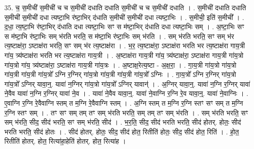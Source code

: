 \documentclass[17pt]{extarticle}
\begin{document}
35. च॒ स॒मीची॑ स॒मीची॑ च च स॒मीची॑ दधाति दधाति स॒मीची॑ च च स॒मीची॑ दधाति । . स॒मीची॑ दधाति दधाति स॒मीची॑ स॒मीची॑ दधा त्यष्टा॒भि र॑ष्टा॒भिर् द॑धाति स॒मीची॑ स॒मीची॑ दधा त्यष्टा॒भिः । . स॒मीची॒ इति॑ स॒मीची᳚ । . द॒धा॒ त्य॒ष्टा॒भि र॑ष्टा॒भिर् द॑धाति दधा त्यष्टा॒भिः सꣳ स म॑ष्टा॒भिर् द॑धाति दधा त्यष्टा॒भिः सम् । . अ॒ष्टा॒भिः सꣳ स म॑ष्टा॒भि र॑ष्टा॒भिः सम् भ॑रति भरति॒ स म॑ष्टा॒भि र॑ष्टा॒भिः सम् भ॑रति । . सम् भ॑रति भरति॒ सꣳ सम् भ॑र त्य॒ष्टाक्ष॑रा॒ ऽष्टाक्ष॑रा भरति॒ सꣳ सम् भ॑र त्य॒ष्टाक्ष॑रा । . भ॒र॒ त्य॒ष्टाक्ष॑रा॒ ऽष्टाक्ष॑रा भरति भर त्य॒ष्टाक्ष॑रा गाय॒त्री गा॑य॒ त्र्य॑ष्टाक्ष॑रा भरति भर त्य॒ष्टाक्ष॑रा गाय॒त्री । . अ॒ष्टाक्ष॑रा गाय॒त्री गा॑य॒ त्र्य॑ष्टाक्ष॑रा॒ ऽष्टाक्ष॑रा गाय॒त्री गा॑य॒त्रो गा॑य॒त्रो गा॑य॒ त्र्य॑ष्टाक्ष॑रा॒ ऽष्टाक्ष॑रा गाय॒त्री गा॑य॒त्रः । . अ॒ष्टाक्ष॒रेत्य॒ष्टा - अ॒क्ष॒रा॒ । . गा॒य॒त्री गा॑य॒त्रो गा॑य॒त्रो गा॑य॒त्री गा॑य॒त्री गा॑य॒त्रो᳚ ऽग्नि र॒ग्निर् गा॑य॒त्रो गा॑य॒त्री गा॑य॒त्री गा॑य॒त्रो᳚ ऽग्निः । . गा॒य॒त्रो᳚ ऽग्नि र॒ग्निर् गा॑य॒त्रो गा॑य॒त्रो᳚ ऽग्निर् यावा॒न्॒. यावा॑ न॒ग्निर् गा॑य॒त्रो गा॑य॒त्रो᳚ ऽग्निर् यावान्॑ । . अ॒ग्निर् यावा॒न्॒. यावा॑ न॒ग्नि र॒ग्निर् यावा॑ ने॒वैव यावा॑ न॒ग्नि र॒ग्निर् यावा॑ ने॒व । . यावा॑ ने॒वैव यावा॒न्॒. यावा॑ ने॒वाग्नि र॒ग्नि रे॒व यावा॒न्॒. यावा॑ ने॒वाग्निः । . ए॒वाग्नि र॒ग्नि रे॒वैवाग्नि स्तम् त म॒ग्नि रे॒वैवाग्नि स्तम् । . अ॒ग्नि स्तम् त म॒ग्नि र॒ग्नि स्तꣳ सꣳ सम् त म॒ग्नि र॒ग्नि स्तꣳ सम् । . तꣳ सꣳ सम् तम् तꣳ सम् भ॑रति भरति॒ सम् तम् तꣳ सम् भ॑रति । . सम् भ॑रति भरति॒ सꣳ सम् भ॑रति॒ सीद॒ सीद॑ भरति॒ सꣳ सम् भ॑रति॒ सीद॑ । . भ॒र॒ति॒ सीद॒ सीद॑ भरति भरति॒ सीद॑ होतर्. होतः॒ सीद॑ भरति भरति॒ सीद॑ होतः । . सीद॑ होतर्. होतः॒ सीद॒ सीद॑ होत॒ रितीति॑ होतः॒ सीद॒ सीद॑ होत॒ रिति॑ । . हो॒त॒ रितीति॑ होतर्. होत॒ रित्या॑हा॒हेति॑ होतर्. होत॒ रित्या॑ह । \newline
\end{document}
